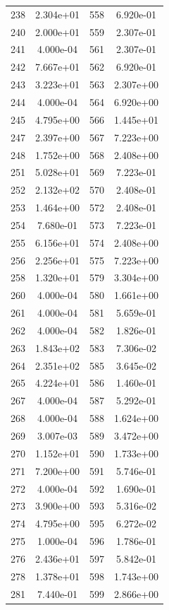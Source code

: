 \documentclass[12pt]{article}
\begin{document}
\begin{longtable}{@{}cccc@{}}
238 & 2.304e+01 & 558 & 6.920e-01 \\
240 & 2.000e+01 & 559 & 2.307e-01 \\
241 & 4.000e-04 & 561 & 2.307e-01 \\
242 & 7.667e+01 & 562 & 6.920e-01 \\
243 & 3.223e+01 & 563 & 2.307e+00 \\
244 & 4.000e-04 & 564 & 6.920e+00 \\
245 & 4.795e+00 & 566 & 1.445e+01 \\
247 & 2.397e+00 & 567 & 7.223e+00 \\
248 & 1.752e+00 & 568 & 2.408e+00 \\
251 & 5.028e+01 & 569 & 7.223e-01 \\
252 & 2.132e+02 & 570 & 2.408e-01 \\
253 & 1.464e+00 & 572 & 2.408e-01 \\
254 & 7.680e-01 & 573 & 7.223e-01 \\
255 & 6.156e+01 & 574 & 2.408e+00 \\
256 & 2.256e+01 & 575 & 7.223e+00 \\
258 & 1.320e+01 & 579 & 3.304e+00 \\
260 & 4.000e-04 & 580 & 1.661e+00 \\
261 & 4.000e-04 & 581 & 5.659e-01 \\
262 & 4.000e-04 & 582 & 1.826e-01 \\
263 & 1.843e+02 & 583 & 7.306e-02 \\
264 & 2.351e+02 & 585 & 3.645e-02 \\
265 & 4.224e+01 & 586 & 1.460e-01 \\
267 & 4.000e-04 & 587 & 5.292e-01 \\
268 & 4.000e-04 & 588 & 1.624e+00 \\
269 & 3.007e-03 & 589 & 3.472e+00 \\
270 & 1.152e+01 & 590 & 1.733e+00 \\
271 & 7.200e+00 & 591 & 5.746e-01 \\
272 & 4.000e-04 & 592 & 1.690e-01 \\
273 & 3.900e+00 & 593 & 5.316e-02 \\
274 & 4.795e+00 & 595 & 6.272e-02 \\
275 & 1.000e-04 & 596 & 1.786e-01 \\
276 & 2.436e+01 & 597 & 5.842e-01 \\
278 & 1.378e+01 & 598 & 1.743e+00 \\
281 & 7.440e-01 & 599 & 2.866e+00 \\

\end{longtable}
\end{document}
